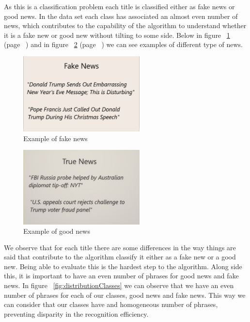 \documentclass[conference]{IEEEtran}
\begin{document}
As this is a classification problem each title is classified either as fake news or good news. In the data set each class has associated an almost even number of news, which contributes to the capability of the algorithm to understand whether it is a fake new or good new without tilting to some side. Below in figure ~\ref{fig:exampleFake} (page ~\pageref{fig:exampleFake}) and in figure ~\ref{fig:exampleGood} (page ~\pageref{fig:exampleGood}) we can see examples of different type of news.

\begin{figure}[H]
    \centering
    \includegraphics[width=2.5in]{pictures/FakeNews.png}
    \caption{Example of fake news}\label{fig:exampleFake}
\end{figure}

\begin{figure}[H]
    \centering
    \includegraphics[width=2.5in]{pictures/GoodNews.png}
    \caption{Example of good news}\label{fig:exampleGood}
\end{figure}



We observe that for each title there are some differences in the way things are said that contribute to the algorithm classify it either as a fake new or a good new. Being able to evaluate this is the hardest step to the algorithm. Along side this, it is important to have an even number of phrases for good news and fake news. In figure ~\ref{fig:distributionClasses} we can observe that we have an even number of phrases for each of our classes, good news and fake news. This way we can consider that our classes have and homogeneous number of phrases, preventing disparity in the recognition efficiency.
 
\end{document}

